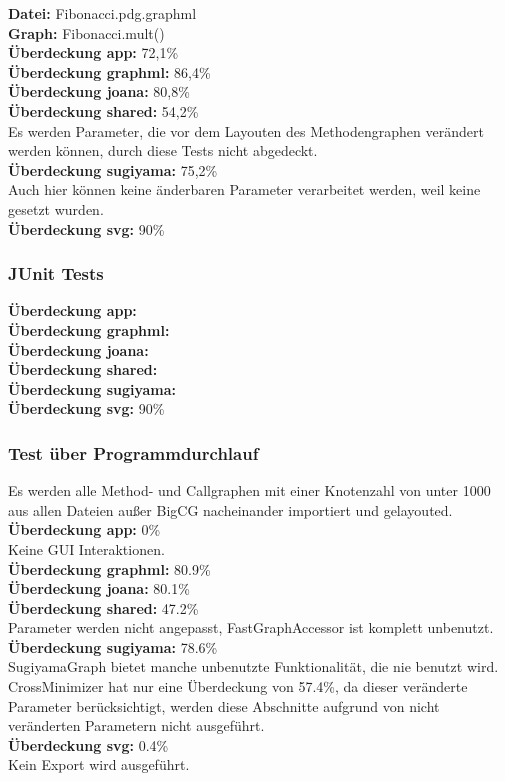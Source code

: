 \textbf{Datei: }Fibonacci.pdg.graphml\\
\textbf{Graph: }Fibonacci.mult()\\
\textbf{Überdeckung app: }72,1\%\\
\textbf{Überdeckung graphml: }86,4\%\\
\textbf{Überdeckung joana: }80,8\%\\
\textbf{Überdeckung shared: }54,2\%\\
Es werden Parameter, die vor dem Layouten des Methodengraphen verändert werden können, durch diese Tests nicht abgedeckt.\\
\textbf{Überdeckung sugiyama: }75,2\%\\
Auch hier können keine änderbaren Parameter verarbeitet werden, weil keine gesetzt wurden.\\
\textbf{Überdeckung svg: }90\%\\
\subsubsection{JUnit Tests}

\textbf{Überdeckung app: }\\
\textbf{Überdeckung graphml: }\\
\textbf{Überdeckung joana: }\\
\textbf{Überdeckung shared: }\\
\textbf{Überdeckung sugiyama: }\\
\textbf{Überdeckung svg: }90\%\\

\subsubsection{Test über Programmdurchlauf}
Es werden alle Method- und Callgraphen mit einer Knotenzahl von unter 1000 aus allen Dateien außer BigCG nacheinander importiert und gelayouted.\\

\textbf{Überdeckung app: }0\%\\
Keine GUI Interaktionen.\\
\textbf{Überdeckung graphml: }80.9\%\\
\textbf{Überdeckung joana: }80.1\%\\
\textbf{Überdeckung shared: }47.2\%\\
Parameter werden nicht angepasst, FastGraphAccessor ist komplett unbenutzt.\\
\textbf{Überdeckung sugiyama: }78.6\%\\
SugiyamaGraph bietet manche unbenutzte Funktionalität, die nie benutzt wird.\\
CrossMinimizer hat nur eine Überdeckung von 57.4\%, da dieser veränderte Parameter berücksichtigt, werden diese Abschnitte aufgrund von nicht veränderten Parametern nicht ausgeführt.\\
\textbf{Überdeckung svg: }0.4\%\\
Kein Export wird ausgeführt.\\

